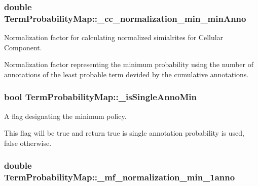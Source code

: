 \subsubsection[{\texorpdfstring{\+\_\+cc\+\_\+normalization\+\_\+min\+\_\+min\+Anno}{_cc_normalization_min_minAnno}}]{\setlength{\rightskip}{0pt plus 5cm}double Term\+Probability\+Map\+::\+\_\+cc\+\_\+normalization\+\_\+min\+\_\+min\+Anno\hspace{0.3cm}{\ttfamily [protected]}}\hypertarget{classTermProbabilityMap_a5a665cb81ee03caca135a9a36cd544a1}{}\label{classTermProbabilityMap_a5a665cb81ee03caca135a9a36cd544a1}


Normalization factor for calculating normalized simialrites for Cellular Component. 

Normalization factor representing the minimum probability using the number of annotations of the least probable term devided by the cumulative annotations. 
\subsubsection[{\texorpdfstring{\+\_\+is\+Single\+Anno\+Min}{_isSingleAnnoMin}}]{\setlength{\rightskip}{0pt plus 5cm}bool Term\+Probability\+Map\+::\+\_\+is\+Single\+Anno\+Min\hspace{0.3cm}{\ttfamily [protected]}}\hypertarget{classTermProbabilityMap_a7cb93d7a55e3002065838f16a1f8c282}{}\label{classTermProbabilityMap_a7cb93d7a55e3002065838f16a1f8c282}


A flag designating the minimum policy. 

This flag will be true and return true is single annotation probability is used, false otherwise. 
\subsubsection[{\texorpdfstring{\+\_\+mf\+\_\+normalization\+\_\+min\+\_\+1anno}{_mf_normalization_min_1anno}}]{\setlength{\rightskip}{0pt plus 5cm}double Term\+Probability\+Map\+::\+\_\+mf\+\_\+normalization\+\_\+min\+\_\+1anno\hspace{0.3cm}{\ttfamily [protected]}}\hypertarget{classTermProbabilityMap_a9c240b82c9cec69d2d777b3a95d81891}{}\label{classTermProbabilityMap_a9c240b82c9cec69d2d777b3a95d81891}


